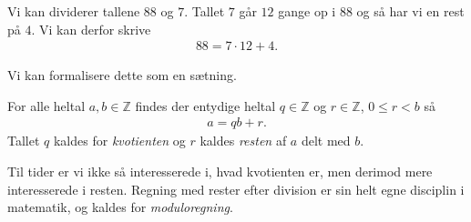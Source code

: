 \begin{exa}
	Vi kan dividerer tallene $88$ og $7$. Tallet $7$ går $12$ gange op i $88$ og så har vi en rest på $4$. Vi kan derfor 
	skrive
	\begin{align*}
		88 = 7\cdot 12 + 4.
	\end{align*}	
\end{exa}
Vi kan formalisere dette som en sætning.
\begin{setn}\label{setn:divmedrest}
	For alle heltal $a, b \in \mathbb{Z}$ findes der entydige heltal $q\in \mathbb{Z}$ og $r \in \mathbb{Z}$,
	$0 \leq r < b$ så
	\begin{align*}
		a = qb + r.
	\end{align*}	 
	Tallet $q$ kaldes for \textit{kvotienten} og $r$ kaldes \textit{resten} af $a$ delt med $b$. 
\end{setn}
Til tider er vi ikke så interesserede i, hvad kvotienten er, men derimod mere interesserede i resten. Regning med rester efter division er sin helt egne disciplin i matematik, og kaldes for \textit{moduloregning}.
